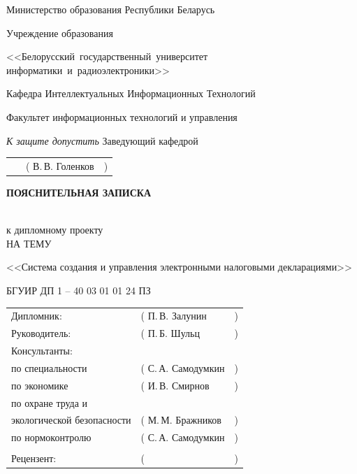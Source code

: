 \documentclass[14pt,a4paper]{reportmod}
\begin{document}
\thispagestyle{empty}
\begin{titlepage}
\begin{center}
Министерство образования Республики Беларусь

\vspace{0.6cm}

Учреждение образования

<<Белорусский~государственный~университет информатики~и~радиоэлектроники>>

\vspace{0.6cm}

Кафедра Интеллектуальных Информационных Технологий

\vspace{0.6cm}

Факультет информационных технологий и управления

\begin{flushright}
 \textit{К защите допустить}
 Заведующий кафедрой
\end{flushright}

\begin{flushright}
\begin{tabular}{p{10.5cm}p{4cm}r}
 ~ & ( В.\,В. Голенков & )
\end{tabular}
\end{flushright}

\vspace{1cm}

\begin{Large}\textbf{ПОЯСНИТЕЛЬНАЯ ЗАПИСКА}\end{Large}\\
к дипломному проекту\\
НА ТЕМУ


<<Система создания и управления электронными налоговыми декларациями>>

БГУИР ДП 1 -- 40 03 01 01 24 ПЗ
\end{center}


\vspace{0.6cm}

\begin{tabular}{p{9.5cm}p{4.5cm}r}
 Дипломник: & ( П.\,В. Залунин & )\\
 Руководитель: & ( П.\,Б. Шульц & )\\
 Консультанты: & &\\
 \hspace{1cm} по специальности & ( С.\,А. Самодумкин & )\\
 \hspace{1cm} по экономике & ( И.\,В. Смирнов & )\\
 \hspace{1cm} по охране труда и & &\\
 \hspace{1cm} экологической безопасности & ( М.\,М. Бражников & )\\
 \hspace{1cm} по нормоконтролю & ( С.\,А. Самодумкин & )\\
 & &\\
 Рецензент: & ( & )\\
\end{tabular}


\end{titlepage}
\end{document}
